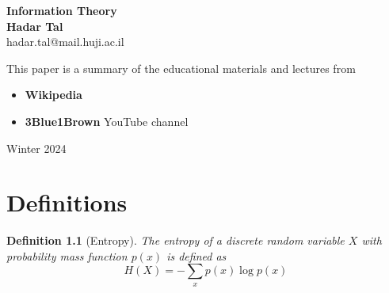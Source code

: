 \documentclass[11pt]{book}
\theoremstyle{boldStyle}
\newtheorem{definition}{Definition}[section]
\begin{document}
\begin{titlepage}
    \begin{center}
     {\huge\bfseries 
    Information Theory     \\}
     \vspace{1.5cm}
     {\Large\bfseries Hadar Tal}\\[5pt]
     hadar.tal@mail.huji.ac.il\\[14pt]
     \vspace{2cm}
     {This paper is a summary of the educational materials and lectures from 
     \begin{itemize}
        \item \textbf{Wikipedia}
        \item \textbf{3Blue1Brown} YouTube channel
     \end{itemize}
     }

     \vfill
    {Winter 2024}
    \end{center}
\end{titlepage}


\frontmatter
\tableofcontents


\mainmatter

\chapter{Definitions}


\begin{definition}[Entropy]
The entropy of a discrete random variable $X$ with probability mass function $p(x)$ is defined as
\begin{equation}
    H(X) = -\sum_{x} p(x) \log p(x)
\end{equation}
\end{definition}
\end{document}
